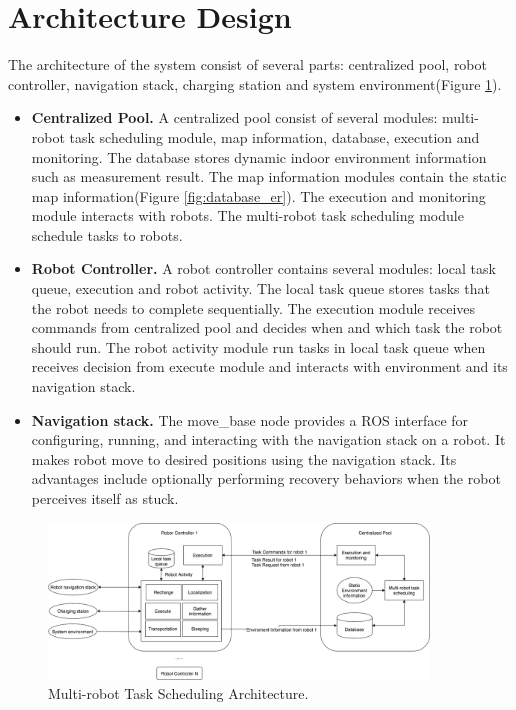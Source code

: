 \section{Architecture Design}
\label{sec:architecture_design}

The architecture of the system consist of several parts: centralized pool, robot controller, navigation stack, charging station and system environment(Figure \ref{fig:system_architecture}). 

\begin{itemize}
	\item \textbf{Centralized Pool.} A centralized pool consist of several modules: multi-robot task scheduling module, map information, database, execution and monitoring. The database stores dynamic indoor environment information such as measurement result. The map information modules contain the static map information(Figure \ref{fig:database_er}). The execution and monitoring module interacts with robots. The multi-robot task scheduling module schedule tasks to robots.
	\item \textbf{Robot Controller.} A robot controller contains several modules: local task queue, execution and robot activity. The local task queue stores tasks that the robot needs to complete sequentially. The execution module receives commands from centralized pool and decides when and which task the robot should run. The robot activity module run tasks in local task queue when receives decision from execute module and interacts with environment and its navigation stack.
	\item \textbf{Navigation stack.} The move\_base node provides a ROS interface for configuring, running, and interacting with the navigation stack on a robot. It makes robot move to desired positions using the navigation stack. Its advantages include optionally performing recovery behaviors when the robot perceives itself as stuck\cite{MOVEBASE}. 
\end{itemize} 

\begin{figure}[htbp]
	\centering
	\includegraphics[width = 0.9\textwidth]{content/images/ch3/architecture.drawio.png}
	\caption{Multi-robot Task Scheduling Architecture.}
	\label{fig:system_architecture}
\end{figure}

